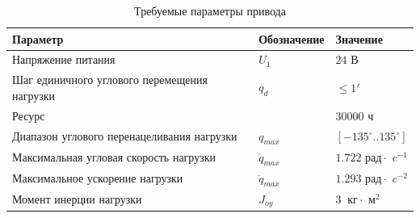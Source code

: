 \begin{table}[h!]
    \centering
    \begin{tabu}{X[l]|X[-1,c,m]|X[-1,l,m]} \hline
        Параметр                                    & Обозначение      & Значение                                       \\
        \hline
        Напряжение питания                          & $U_1$            & $24 \textit{ В} $                              \\
        Шаг единичного углового перемещения нагрузки& $q_d$            & $ \le 1' $                                     \\
        Ресурс                                      &                  & $30000 \textit{ ч} $                           \\
        Диапазон углового перенацеливания нагрузки  & $q_{max}$        & $[-135^\circ .. 135^\circ] $                   \\
        Максимальная угловая скорость нагрузки      & $\dot{q}_{max}$  & $1.722 \textit{ рад} \cdot \textit{ c}^{-1}$   \\
        Максимальное ускорение нагрузки             & $\ddot{q}_{max}$ & $1.293 \textit{ рад} \cdot \textit{ c}^{-2}$   \\
        Момент инерции нагрузки                     & $J_{oy}$         & $3 ~\textit{ кг} \cdot \textit{ м}^2 $         \\
        \hline
    \end{tabu}
    \caption{Требуемые параметры привода}
    \label{drive_parameters_tbl}
\end{table}


